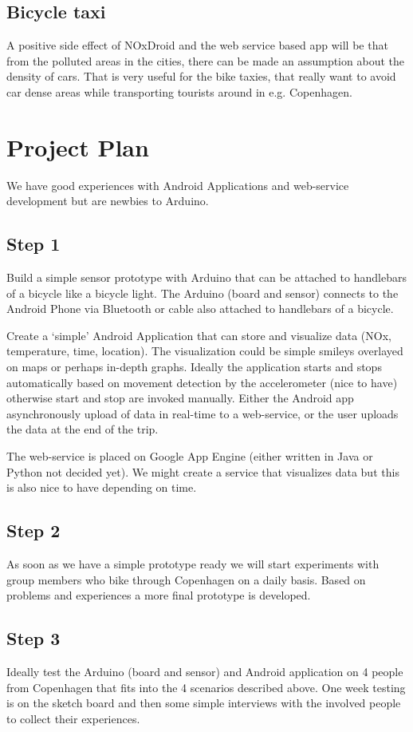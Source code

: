 \documentclass{ubicomp2011}
\begin{document}
\pagebreak
\subsection{Bicycle taxi}
A positive side effect of NOxDroid and the web service based app will be that from the polluted areas in the cities, there can be made an assumption about the density of cars. That is very useful for the bike taxies, that really want to avoid car dense areas while transporting tourists around in e.g. Copenhagen.

\section{Project Plan}

We have good experiences with Android Applications and web-service development but are newbies to Arduino.
\subsection{Step 1}
Build a simple sensor prototype with Arduino that can be attached to handlebars of a bicycle like a bicycle light. The Arduino (board and sensor) connects to the Android Phone via Bluetooth or cable also attached to handlebars of a bicycle.

Create a ‘simple’ Android Application that can store and visualize data (NOx, temperature, time, location). The visualization could be simple smileys overlayed on maps or perhaps in-depth graphs. Ideally the application starts and stops automatically based on movement detection by the accelerometer (nice to have) otherwise start and stop are invoked manually. Either the Android app asynchronously upload of data in real-time to a web-service, or the user uploads the data at the end of the trip.

The web-service is placed on Google App Engine (either written in Java or Python not decided yet). We might create a service that visualizes data but this is also nice to have depending on time. 

\subsection{Step 2}
As soon as we have a simple prototype ready we will start experiments with group members who bike through Copenhagen on a daily basis. Based on problems and experiences a more final prototype is developed.

\subsection{Step 3}
Ideally test the Arduino (board and sensor) and Android application on 4 people from Copenhagen that fits into the 4 scenarios described above. One week testing is on the sketch board and then some simple interviews with the involved people to collect their experiences.
\end{document}
